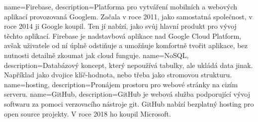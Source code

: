 {
  name={Firebase},
  description={Platforma pro vytváření mobilních a webových aplikací provozovaná Googlem. Začala v roce 2011, jako 
    samostatná společnost, v roce 2014 ji Google koupil. Ten jí nabízí, jako svůj hlavní produkt pro vývoj těchto 
    aplikací. Firebase je nadstavbová aplikace nad Google Cloud Platform, avšak uživatele od ní úplně odstiňuje 
  a umožňuje komfortně tvořit aplikace, bez nutnosti detailně zkoumat jak cloud funguje. \parencite{wiki:firebase}}
}
{
  name={NoSQL},
  description={Databázový koncept, který nepoužívá tabulky, ale ukládá data jinak. Například jako dvojice klíč-hodnota, 
  nebo třeba jako stromovou strukturu. \parencite{wiki:nosql}}
}
{
  name={hosting},
  description={Pronájem prostoru pro webové stránky na cizím serveru. \parencite{wiki:hosting}}
}
{
  name={GitHub},
  description={GitHub je webová služba podporující vývoj softwaru za pomoci verzovacího nástroje \gls{git}. GitHub 
  nabízí bezplatný \gls{hosting} pro open source projekty. V roce 2018 ho koupil Microsoft. \parencite{wiki:github}}
}

